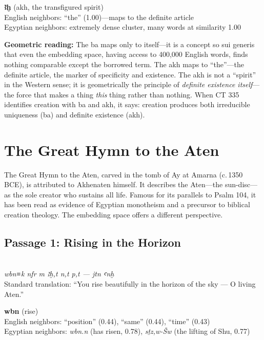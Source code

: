 \documentclass[11pt, a4paper]{article}
\newcommand{\passagehiero}[1]{{\normalfont\hierofont\fontsize{14}{17}\selectfont #1}}
\begin{document}
\medskip

\noindent\textbf{ꜣḫ} (akh, the transfigured spirit)\\
English neighbors: ``the'' (1.00)---maps to the definite article\\
Egyptian neighbors: extremely dense cluster, many words at similarity 1.00

\medskip

{\color{insight}\textbf{Geometric reading:}} The ba maps only to itself---it is a concept so sui generis that even the embedding space, having access to 400,000 English words, finds nothing comparable except the borrowed term. The akh maps to ``the''---the definite article, the marker of specificity and existence. The akh is not a ``spirit'' in the Western sense; it is geometrically the principle of \textit{definite existence itself}---the force that makes a thing \textit{this} thing rather than nothing. When CT 335 identifies creation with ba and akh, it says: creation produces both irreducible uniqueness (ba) and definite existence (akh).

\section{The Great Hymn to the Aten}
\label{sec:aten}

The Great Hymn to the Aten, carved in the tomb of Ay at Amarna (c.\,1350 BCE), is attributed to Akhenaten himself. It describes the Aten---the sun-disc---as the sole creator who sustains all life. Famous for its parallels to Psalm 104, it has been read as evidence of Egyptian monotheism and a precursor to biblical creation theology. The embedding space offers a different perspective.

\subsection{Passage 1: Rising in the Horizon}

{\color{passage}\passagehiero{𓅱𓃀𓈖𓇳𓎡 𓄤 𓅓 𓈌𓏏𓉐 𓈖𓏏 𓇯𓏏 --- 𓇋𓏏𓈖𓇳 𓋹}\\\medskip
\textit{\small wbn≡k nfr m ꜣḫ,t n,t p,t --- jtn ꜥnḫ}\\
Standard translation: ``You rise beautifully in the horizon of the sky --- O living Aten.''}

\bigskip

\noindent\textbf{wbn} (rise)\\
English neighbors: ``position'' (0.44), ``same'' (0.44), ``time'' (0.43)\\
Egyptian neighbors: \textit{wbn.n} (has risen, 0.78), \textit{sṯz,w-Šw} (the lifting of Shu, 0.77)
\end{document}
